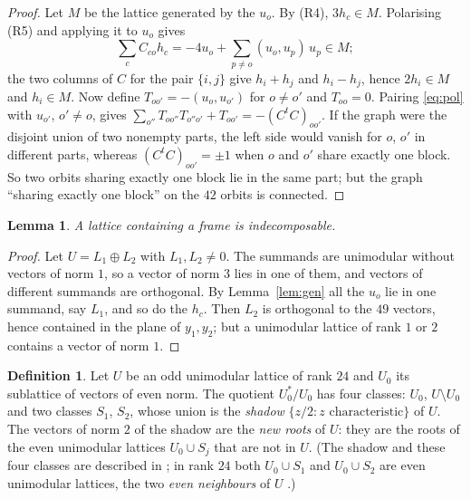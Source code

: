 \documentclass[11pt]{amsart}
\newtheorem{lemma}[theorem]{Lemma}
\theoremstyle{definition}
\newtheorem{definition}[theorem]{Definition}
\theoremstyle{remark}
\begin{document}
\begin{proof}
Let $M$ be the lattice generated by the $u_o$. By (R4), $3h_c\in M$. Polarising (R5) and applying it to $u_o$ gives
\begin{equation}\label{eq:pol}
\textstyle\sum_cC_{co}h_c=-4u_o+\sum_{p\ne o}(u_o,u_p)\,u_p\in M ;
\end{equation}
the two columns of $C$ for the pair $\{i,j\}$ give $h_i+h_j$ and $h_i-h_j$, hence $2h_i\in M$ and $h_i\in M$. Now define
$T_{oo'}=-(u_o,u_{o'})$ for $o\ne o'$ and $T_{oo}=0$. Pairing \eqref{eq:pol} with $u_{o'}$, $o'\ne o$, gives
$\sum_{o''}T_{oo''}T_{o''o'}+T_{oo'}=-(C^tC)_{oo'}$. If the graph were the disjoint union of two nonempty parts, the left side
would vanish for $o$, $o'$ in different parts, whereas $(C^tC)_{oo'}=\pm1$ when $o$ and $o'$ share exactly one block. So two
orbits sharing exactly one block lie in the same part; but the graph ``sharing exactly one block'' on the $42$ orbits is
connected.
\end{proof}

\begin{lemma}\label{lem:indec}
A lattice containing a frame is indecomposable.
\end{lemma}

\begin{proof}
Let $U=L_1\oplus L_2$ with $L_1,L_2\ne0$. The summands are unimodular without vectors of norm $1$, so a vector of norm $3$
lies in one of them, and vectors of different summands are orthogonal. By Lemma~\ref{lem:gen} all the $u_o$ lie in one
summand, say $L_1$, and so do the $h_c$. Then $L_2$ is orthogonal to the $49$ vectors, hence contained in the plane of
$y_1,y_2$; but a unimodular lattice of rank $1$ or $2$ contains a vector of norm $1$.
\end{proof}

\begin{definition}\label{def:shadow}
Let $U$ be an odd unimodular lattice of rank $24$ and $U_0$ its sublattice of vectors of even norm. The quotient
$U_0^*/U_0$ has four classes: $U_0$, $U\setminus U_0$ and two classes $S_1$, $S_2$, whose union is the \emph{shadow}
$\{z/2: z \text{ characteristic}\}$ of $U$. The vectors of norm $2$ of the shadow are the \emph{new roots} of $U$: they are the
roots of the even unimodular lattices $U_0\cup S_j$ that are not in $U$. (The shadow and these four classes are described in \cite[\S2, p.~386]{CS90}; in rank $24$ both $U_0\cup S_1$ and
$U_0\cup S_2$ are even unimodular lattices, the two \emph{even neighbours} of $U$ \cite{Bor}.)
\end{definition}
\end{document}
